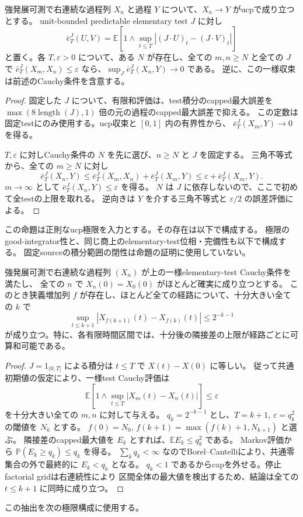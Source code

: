 \begin{proposition}
強発展可測で右連続な過程列 $X_n$ と過程 $Y$ について、$X_n\to Y$ がucpで成り立つとする。
unit-bounded predictable elementary test $J$ に対し
\[
 \bar e_T^J(U,V)=\mathbb E\!\left[1\wedge\sup_{t\le T}|(J\cdot U)_t-(J\cdot V)_t|\right]
\]
と置く。各 $T,\varepsilon>0$ について、ある $N$ が存在し、全ての $m,n\ge N$ と全ての $J$ で
$\bar e_T^J(X_m,X_n)\le\varepsilon$ なら、$\sup_J \bar e_T^J(X_n,Y)\to0$ である。
逆に、この一様収束は前述のCauchy条件を含意する。
\end{proposition}
\begin{proof}
固定した $J$ について、有限和評価は、test積分のcapped最大誤差を
$\max(8\operatorname{length}(J),1)$ 倍の元の過程のcapped最大誤差で抑える。
この定数は固定testにのみ使用する。ucp収束と $[0,1]$ 内の有界性から、
$\bar e_T^J(X_m,Y)\to0$ を得る。

$T,\varepsilon$ に対しCauchy条件の $N$ を先に選び、$n\ge N$ と $J$ を固定する。
三角不等式から、全ての $m\ge N$ に対し
\[
 \bar e_T^J(X_n,Y)\le \bar e_T^J(X_m,X_n)+\bar e_T^J(X_m,Y)
 \le\varepsilon+\bar e_T^J(X_m,Y).
\]
$m\to\infty$ として $\bar e_T^J(X_n,Y)\le\varepsilon$ を得る。
$N$ は $J$ に依存しないので、ここで初めて全testの上限を取れる。
逆向きは $Y$ を介する三角不等式と $\varepsilon/2$ の誤差評価による。
\end{proof}
この命題は正則なucp極限を入力とする。その存在は以下で構成する。
極限のgood-integrator性と、同じ商上のelementary-test位相・完備性も以下で構成する。
固定sourceの積分範囲の閉性は命題の証明に使用していない。

\begin{proposition}[増大時間区間上の速い部分列]
強発展可測で右連続な過程列 $(X_n)$ が上の一様elementary-test Cauchy条件を満たし、
全ての $n$ で $X_n(0)=X_0(0)$ がほとんど確実に成り立つとする。
このとき狭義増加列 $f$ が存在し、ほとんど全ての経路について、十分大きい全ての $k$ で
\[
 \sup_{t\le k+1}|X_{f(k+1)}(t)-X_{f(k)}(t)|\le 2^{-k-1}
\]
が成り立つ。特に、各有限時間区間では、十分後の隣接差の上限が経路ごとに可算和可能である。
\end{proposition}
\begin{proof}
$J=1_{(0,T]}$ による積分は $t\le T$ で $X(t)-X(0)$ に等しい。
従って共通初期値の仮定により、一様test Cauchy評価は
\[
 \mathbb E\!\left[1\wedge\sup_{t\le T}|X_m(t)-X_n(t)|\right]\le\varepsilon
\]
を十分大きい全ての $m,n$ に対して与える。
$q_k=2^{-k-1}$ とし、$T=k+1$, $\varepsilon=q_k^2$ の閾値を $N_k$ とする。
$f(0)=N_0$, $f(k+1)=\max(f(k)+1,N_{k+1})$ と選ぶ。
隣接差のcapped最大値を $E_k$ とすれば、$\mathbb E E_k\le q_k^2$ である。
Markov評価から $\mathbb P(E_k\ge q_k)\le q_k$ を得る。
$\sum_k q_k<\infty$ なのでBorel--Cantelliにより、共通零集合の外で最終的に $E_k<q_k$ となる。
$q_k<1$ であるからcapを外せる。停止factorial gridは右連続性により
区間全体の最大値を検出するため、結論は全ての $t\le k+1$ に同時に成り立つ。
\end{proof}
この抽出を次の極限構成に使用する。

